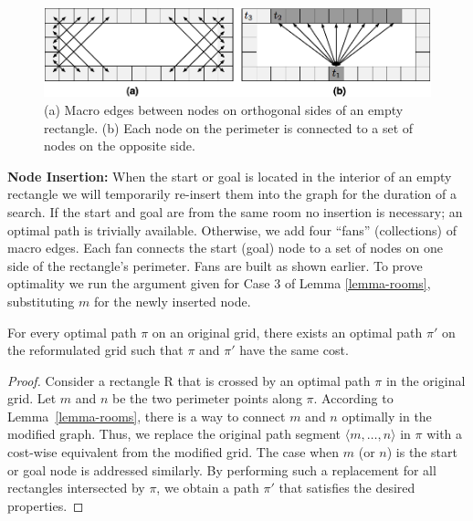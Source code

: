 \begin{figure}[tb]
       \begin{center}
		   \includegraphics[width=0.97\columnwidth, trim = 10mm 10mm 10mm 0mm]
			{diagrams/macroedges_wide.png}
       \end{center}
	\vspace{-3pt}
       \caption{(a) Macro edges between nodes on orthogonal sides of an empty
       rectangle. (b) Each node on the perimeter is connected to a set of 
		nodes on the opposite side.}
       \label{fig-macroedges}
\end{figure}

\noindent
\textbf{Node Insertion:}
When the start or goal is located in the interior of an empty rectangle
we will temporarily re-insert them into the graph for the duration of a search.
{If the start and goal are from the same room no insertion is necessary; an optimal path is trivially
available. } {Otherwise, we add four ``fans'' (collections) of macro edges.  Each fan connects
the start (goal) node to a set of nodes on one side of the rectangle's
perimeter.  Fans are built as shown earlier.}
To prove optimality we run the argument given
for Case 3 of Lemma \ref{lemma-rooms}, substituting $m$ for the newly inserted node.

\begin{theorem}
For every optimal path $\pi$ on an original grid, there exists an optimal path
$\pi'$ on the reformulated grid such that $\pi$ and $\pi'$ have the
same cost.
\end{theorem}
\begin{proof}
Consider a rectangle R that is crossed by an optimal path $\pi$ in the original grid.
Let $m$ and $n$ be the two perimeter points along $\pi$.
According to Lemma~\ref{lemma-rooms}, there is a way to connect $m$ and $n$
optimally in the modified graph. Thus, we replace the original path segment $\langle m,
\dots, n\rangle$ in $\pi$ with a cost-wise equivalent from the
modified grid.  The case when $m$ (or $n$) is the start or goal node is
addressed similarly.  By performing such a
replacement for all rectangles intersected by $\pi$, we obtain a
path $\pi'$ that satisfies the desired properties.
\end{proof}


